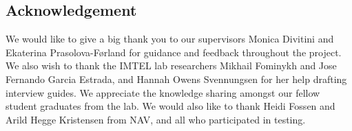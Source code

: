 \setcounter{page}{1}

\pagestyle{fancy}
\fancyhf{}
\renewcommand{\chaptermark}[1]{\markboth{\chaptername\ \thechapter.\ #1}{}}
\renewcommand{\sectionmark}[1]{\markright{\thesection\ #1}}
\renewcommand{\headrulewidth}{0.1ex}
\renewcommand{\footrulewidth}{0.1ex}
\fancyfoot[LE,RO]{\thepage}
\fancypagestyle{plain}{\fancyhf{}\fancyfoot[LE,RO]{\thepage}\renewcommand{\headrulewidth}{0ex}}


\vspace*{1mm}

\begin{center}
\section*{\Huge Acknowledgement}
\vspace*{0.7cm}
\end{center}

\noindent We would like to give a big thank you to our supervisors Monica Divitini and Ekaterina Prasolova-Førland for guidance and feedback throughout the project. We also wish to thank the IMTEL lab researchers Mikhail Fominykh and Jose Fernando Garcia Estrada, and Hannah Owens Svennungsen for her help drafting interview guides. We appreciate the knowledge sharing amongst our fellow student graduates from the lab.  
We would also like to thank Heidi Fossen and Arild Hegge Kristensen from NAV, and all who participated in testing.
 

\vspace*{0.7cm}
\begin{flushright}
\myauthor
\end{flushright}

\cleardoublepage